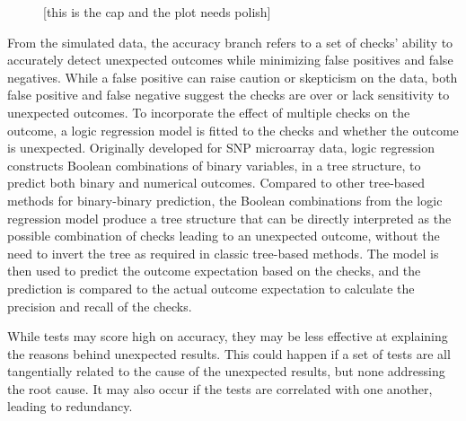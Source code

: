 \documentclass[
  12pt,
]{interact}
\begin{document}
\label{cell-fig-metric-calc}
\begin{figure}[H]


\caption{\label{fig-metric-calc}{[}this is the cap and the plot needs
polish{]}}

\end{figure}%

From the simulated data, the accuracy branch refers to a set of checks'
ability to accurately detect unexpected outcomes while minimizing false
positives and false negatives. While a false positive can raise caution
or skepticism on the data, both false positive and false negative
suggest the checks are over or lack sensitivity to unexpected outcomes.
To incorporate the effect of multiple checks on the outcome, a logic
regression model \citep{ruczinski_logic_2003} is fitted to the checks
and whether the outcome is unexpected. Originally developed for SNP
microarray data, logic regression constructs Boolean combinations of
binary variables, in a tree structure, to predict both binary and
numerical outcomes. Compared to other tree-based methods for
binary-binary prediction, the Boolean combinations from the logic
regression model produce a tree structure that can be directly
interpreted as the possible combination of checks leading to an
unexpected outcome, without the need to invert the tree as required in
classic tree-based methods. The model is then used to predict the
outcome expectation based on the checks, and the prediction is compared
to the actual outcome expectation to calculate the precision and recall
of the checks.

While tests may score high on accuracy, they may be less effective at
explaining the reasons behind unexpected results. This could happen if a
set of tests are all tangentially related to the cause of the unexpected
results, but none addressing the root cause. It may also occur if the
tests are correlated with one another, leading to redundancy.
\end{document}

